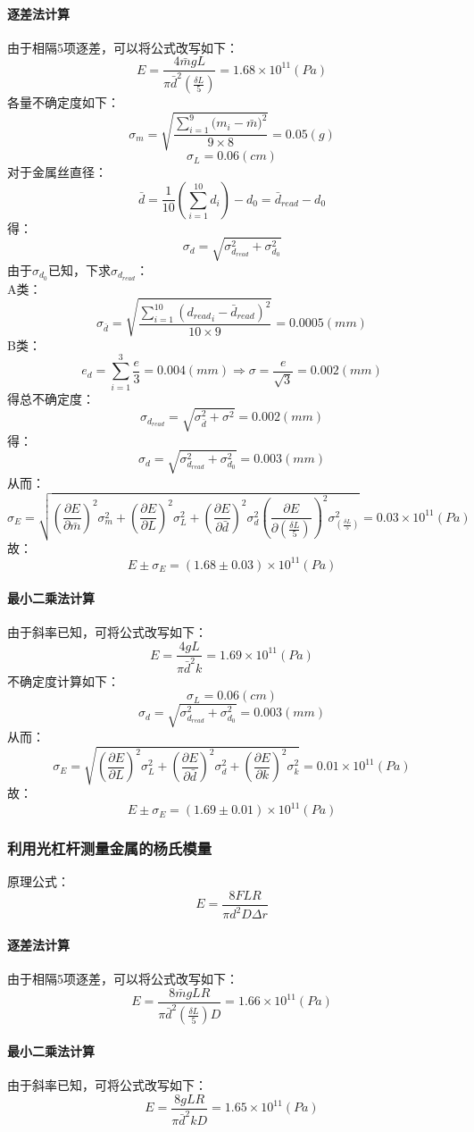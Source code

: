 \documentclass{ctexart}
\begin{document}
\paragraph{逐差法计算}
由于相隔5项逐差，可以将公式改写如下：
$$E=\frac{4\bar{m}gL}{\pi \bar{d}^2 (\frac{\delta L}5)}=1.68\times 10^{11}(Pa)$$
各量不确定度如下：
$$\sigma_m=\sqrt{\frac{\sum\limits_{i=1}^9{(m_i-\bar{m}})^2}{9\times 8}}=0.05(g)$$
$$\sigma_L=0.06(cm)$$
对于金属丝直径：
$$\bar{d}=\frac{1}{10}(\sum_{i=1}^{10}{d_i})-d_0=\bar{d}_{read}-d_0$$
得：
$$\sigma_d=\sqrt{\sigma_{d_{read}}^2+\sigma_{d_0}^2}$$
由于$\sigma_{d_0}$已知，下求$\sigma_{d_{read}}$：
\\
A类：$$\sigma_{\bar{d}}=\sqrt{\frac{\sum\limits_{i=1}^{10}{({d_{read}}_i-\bar{d}_{read})^2}}{10\times9}}=0.0005(mm)$$
B类：$$e_d=\sum\limits_{i=1}^3{\frac{e}3}=0.004(mm)\Rightarrow \sigma=\frac{e}{\sqrt{3}}=0.002(mm)$$
得总不确定度：$$\sigma_{d_{read}}=\sqrt{\sigma_{\bar{d}}^2+\sigma^2}=0.002(mm)$$
得：$$\sigma_d=\sqrt{\sigma_{d_{read}}^2+\sigma_{d_0}^2}=0.003(mm)$$
从而：
$$\sigma_E=\sqrt{(\frac{\partial E}{\partial \bar{m}})^2\sigma_m^2+(\frac{\partial E}{\partial L})^2\sigma_L^2+(\frac{\partial E}{\partial \bar{d}})^2\sigma_d^2(\frac{\partial E}{\partial{(\frac{\delta L}5)} })^2\sigma_{(\frac{\delta L}5)}^2}=0.03\times 10^{11}(Pa)$$
故：$$E\pm \sigma_E=(1.68\pm 0.03)\times 10^{11}(Pa)$$
\paragraph{最小二乘法计算}
由于斜率已知，可将公式改写如下：
$$E=\frac{4gL}{\pi \bar{d}^2 k}=1.69\times 10^{11}(Pa)$$
不确定度计算如下：
$$\sigma_L=0.06(cm)$$
$$\sigma_d=\sqrt{\sigma_{d_{read}}^2+\sigma_{d_0}^2}=0.003(mm)$$
从而：
$$\sigma_E=\sqrt{(\frac{\partial E}{\partial L})^2\sigma_L^2+(\frac{\partial E}{\partial \bar{d}})^2\sigma_d^2+(\frac{\partial E}{\partial k })^2\sigma_k^2}=0.01\times 10^{11}(Pa)$$
故：$$E\pm \sigma_E=(1.69\pm 0.01)\times 10^{11}(Pa)$$
\subsubsection{利用光杠杆测量金属的杨氏模量}
原理公式：
$$E=\frac{8FLR}{\pi d^2 D\Delta r}$$
\paragraph{逐差法计算}
由于相隔5项逐差，可以将公式改写如下：
$$E=\frac{8\bar{m}gLR}{\pi \bar{d}^2 (\frac{\delta L}5 )D}=1.66\times 10^{11}(Pa)$$
\paragraph{最小二乘法计算}
由于斜率已知，可将公式改写如下：
$$E=\frac{8gLR}{\pi \bar{d}^2 kD}=1.65\times 10^{11}(Pa)$$
\end{document}
